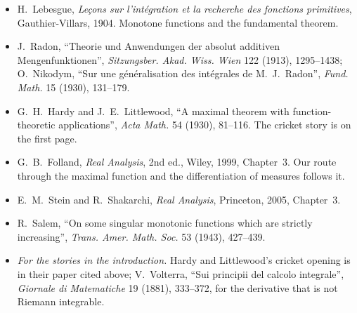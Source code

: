 \begin{itemize}
\item H.~Lebesgue, \emph{Le\c cons sur l'int\'egration et la recherche des fonctions primitives}, Gauthier-Villars, 1904. Monotone functions and the fundamental theorem.
\item J.~Radon, ``Theorie und Anwendungen der absolut additiven Mengenfunktionen'', \emph{Sitzungsber. Akad. Wiss. Wien} 122 (1913), 1295--1438; O.~Nikodym, ``Sur une g\'en\'eralisation des int\'egrales de M.~J.~Radon'',
\emph{Fund. Math.} 15 (1930), 131--179.
\item G.~H.~Hardy and J.~E.~Littlewood, ``A maximal theorem with function-theoretic applications'', \emph{Acta Math.} 54 (1930), 81--116. The cricket story is on the first page.
\item G.~B.~Folland, \emph{Real Analysis}, 2nd ed., Wiley, 1999, Chapter~3. Our route through the maximal function and the differentiation of measures follows it.
\item E.~M.~Stein and R.~Shakarchi, \emph{Real Analysis}, Princeton, 2005, Chapter~3.
\item R.~Salem, ``On some singular monotonic functions which are strictly increasing'', \emph{Trans. Amer. Math. Soc.} 53 (1943), 427--439.
\item \emph{For the stories in the introduction.} Hardy and Littlewood's cricket opening is in their paper cited above; V.~Volterra, ``Sui principii del calcolo integrale'', \emph{Giornale
di Matematiche} 19 (1881), 333--372, for the derivative that is not Riemann integrable.
\end{itemize}
